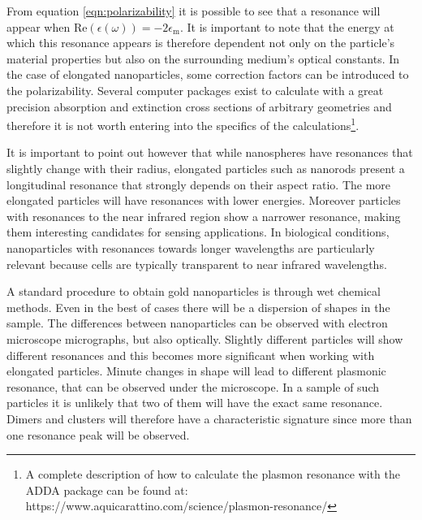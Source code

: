 From equation \ref{eqn:polarizability} it is possible to see that a resonance
will appear when ${\textrm{Re}(\epsilon(\omega)) = -2\epsilon_\textrm{m}}$. It
is important to note that the energy at which this resonance appears is therefore
dependent not only on the particle's material properties but also on the
surrounding medium's optical constants. In the case of elongated nanoparticles,
some correction factors can be introduced to the polarizability. Several
computer packages\cite{Yurkin2011,oskooi2010meep,Draine1994a} exist to
calculate with a great precision absorption and extinction cross sections of
arbitrary geometries and therefore it is not worth entering into the specifics
of the calculations\footnote{A complete description of how to calculate the
plasmon resonance with the ADDA package can be found at:\newline
https://www.aquicarattino.com/science/plasmon-resonance/}.

\begin{sloppypar}
It is important to point out however that while nanospheres have resonances
that slightly change with their radius, elongated particles such as nanorods
present a longitudinal resonance that strongly depends on their aspect ratio.
The more elongated particles will have resonances with lower energies. Moreover
particles with resonances to the near infrared region show a narrower
resonance\cite{Sonnichsen2002}, making them interesting candidates for sensing
applications. In biological conditions, nanoparticles with resonances towards
longer wavelengths are particularly relevant because cells are typically
transparent to near infrared wavelengths.
\end{sloppypar}

\begin{sloppypar}
A standard procedure to obtain gold nanoparticles is through wet chemical
methods\cite{Vigderman2012}. Even in the best of cases there will be a
dispersion of shapes in the sample. The differences between nanoparticles can be
observed with electron microscope micrographs, but also optically. Slightly
different particles will show different resonances\cite{Lindfors2004} and this
becomes more significant when working with elongated particles. Minute changes
in shape will lead to different plasmonic resonance, that can be observed under the
microscope. In a sample of such particles it is unlikely that two of them will
have the exact same resonance. Dimers and clusters will therefore have a
characteristic signature since more than one resonance peak will be observed.
\end{sloppypar}

